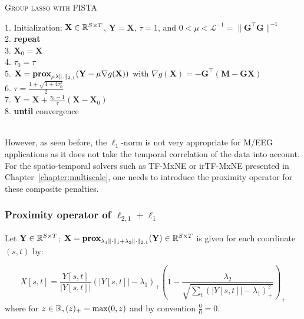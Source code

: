 {\fontsize{4}{4}\selectfont
\begin{algorithm}[t]
\caption{\textsc{Group \ac{lasso} with FISTA}}

1. Initialization: $\mathbf{X}\in\mathbb{R}^{S\times T}$, $\mathbf{Y}=\mathbf{X}$, $\tau=1$, and $0 < \mu < \mathcal{L}^{-1} = \|\mathbf{G}^\top\mathbf{G}\|^{-1}$\\
2. \textbf{repeat}\\
3. \hspace{4pt} $\mathbf{X}_0 = \mathbf{X}$\\
4. \hspace{4pt} $\tau_0 = \tau$\\
5. \hspace{4pt} $\mathbf{X} = \textbf{prox}_{\mu\lambda\|.\|_{2,1}}(\mathbf{Y}-\mu\nabla g(\mathbf{X}))$ with $\nabla g(\mathbf{X})= -\mathbf{G}^\top(\mathbf{M}-\mathbf{GX})$ \\
6. \hspace{4pt} $\tau = \frac{1+\sqrt{1+4\tau^2_0}}{2}$\\
7. \hspace{4pt} $\mathbf{Y} = \mathbf{X} + \frac{\tau_0 - 1}{\tau}(\mathbf{X}-\mathbf{X}_0)$\\
8. \textbf{until} convergence\\
\\
\label{alg:FISTA}
\end{algorithm}
}

However, as seen before, the $\ell_1$-norm is not very appropriate for M/EEG applications as it does not take the temporal correlation of the data into account. For the spatio-temporal solvers such as TF-MxNE or irTF-MxNE presented in Chapter~\ref{chapter:multiscale}, one needs to introduce the proximity operator for these composite penalties.

\adjustwidth{1em}{0pt}
\subsubsection*{Proximity operator of $\ell_{2,1}+\ell_1$}
Let $\mathbf{Y}\in\mathbb{R}^{S\times T}$; $\mathbf{X}=\textbf{prox}_{\lambda_1\|\cdot\|_1+\lambda_2\|\cdot\|_{2,1}}(\mathbf{Y})\in\mathbb{R}^{S\times T}$ is given for each coordinate $(s,t)$ by:

\begin{equation} \label{prox_mixed}
	X[s,t]=\frac{Y[s,t]}{|Y[s,t]|}(|Y[s,t]|-\lambda_1)_+\left(1-\frac{\lambda_2}{\sqrt{\sum_t(|Y[s,t]|-\lambda_1)_+^{2}}}\right)_+
\end{equation}
where for $z\in\mathbb{R}, (z)_+ =\max(0,z)$ and by convention $\frac{0}{0}=0$.
\endadjustwidth


